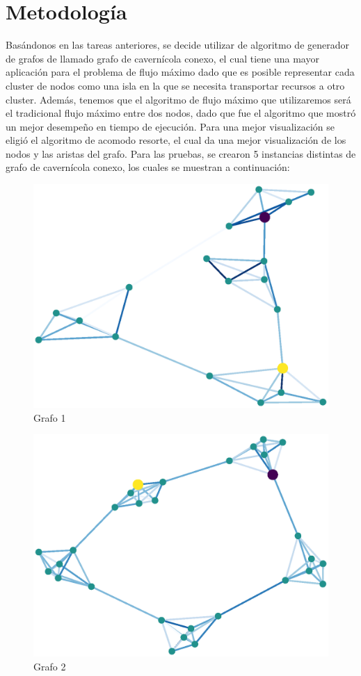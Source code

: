 \documentclass{article}
\begin{document}
\section{Metodología}
Basándonos en las tareas anteriores, se decide utilizar de algoritmo de generador de grafos de llamado grafo de cavernícola conexo, el cual tiene una mayor aplicación para el problema de flujo máximo dado que es posible representar cada cluster de nodos como una isla en la que se necesita transportar recursos a otro cluster. Además, tenemos que el algoritmo de flujo máximo que utilizaremos será el tradicional flujo máximo entre dos nodos, dado que fue el algoritmo que mostró un mejor desempeño en tiempo de ejecución. Para una mejor visualización se eligió el algoritmo de acomodo resorte, el cual da una mejor visualización de los nodos y las aristas del grafo.
Para las pruebas, se crearon 5 instancias distintas de grafo de cavernícola conexo, los cuales se muestran a continuación:
\begin{figure}[H]
    \includegraphics[width=\textwidth]{grafo-1}
    \caption{Grafo 1}
    \label{fig:matriz}
\end{figure}
\begin{figure}[H]
    \includegraphics[width=\textwidth]{grafo-2}
    \caption{Grafo 2}
    \label{fig:matriz}
\end{figure}
\end{document}
